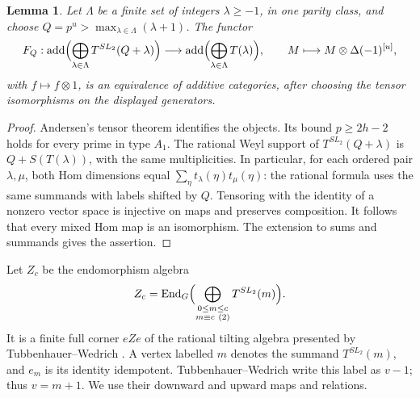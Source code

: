 \documentclass[11pt,reqno]{amsart}
\newcommand{\add}{\operatorname{add}}\newcommand{\im}{\operatorname{im}}\newcommand{\coker}{\operatorname{coker}}\newcommand{\rad}{\operatorname{rad}}
\newtheorem{lemma}[theorem]{Lemma}
\theoremstyle{definition}
\theoremstyle{remark}
\numberwithin{equation}{section}
\begin{document}
\begin{lemma}\label{lem:rational-transport}
Let $\Lambda$ be a finite set of integers $\lambda\geq-1$, in one
parity class, and choose $Q=p^u>\max_{\lambda\in\Lambda}(\lambda+1)$.
The functor
\[
 F_Q:\add\Bigl(\bigoplus_{\lambda\in\Lambda}T^{SL_2}(Q+\lambda)\Bigr)
       \longrightarrow
       \add\Bigl(\bigoplus_{\lambda\in\Lambda}T(\lambda)\Bigr),
 \qquad M\longmapsto M\otimes\Delta(-1)^{[u]},
\]
with $f\mapsto f\otimes1$, is an equivalence of additive categories,
after choosing the tensor isomorphisms on the displayed generators.
\end{lemma}
\begin{proof}
Andersen's tensor theorem \cite[Theorem~7.7(2), p.~1500]{Andersen}
identifies the objects. Its bound $p\geq2h-2$ holds for every prime
in type $A_1$. The rational Weyl support of
$T^{SL_2}(Q+\lambda)$ is $Q+S(T(\lambda))$, with the same
multiplicities. In particular, for each ordered pair $\lambda,\mu$,
both Hom dimensions equal
$\sum_\eta t_\lambda(\eta)t_\mu(\eta)$: the rational formula uses
the same summands with labels shifted by $Q$.
Tensoring with the identity of a nonzero vector space is injective
on maps and preserves composition. It follows that every mixed
Hom map is an isomorphism. The extension to sums and summands gives
the assertion.
\end{proof}

Let $Z_c$ be the endomorphism algebra
\[
 Z_c=\operatorname{End}_G\Bigl(
       \bigoplus_{\substack{0\leq m\leq c\\m\equiv c\ (2)}}T^{SL_2}(m)
              \Bigr).
\]
It is a finite full corner $eZe$ of the rational tilting algebra presented
by Tubbenhauer--Wedrich \cite[Theorem~A and Theorem~3.2]{TW}.
A vertex labelled $m$ denotes the summand $T^{SL_2}(m)$, and $e_m$
is its identity idempotent. Tubbenhauer--Wedrich write this label as
$v-1$; thus $v=m+1$. We use their downward and upward maps and relations.
\end{document}
